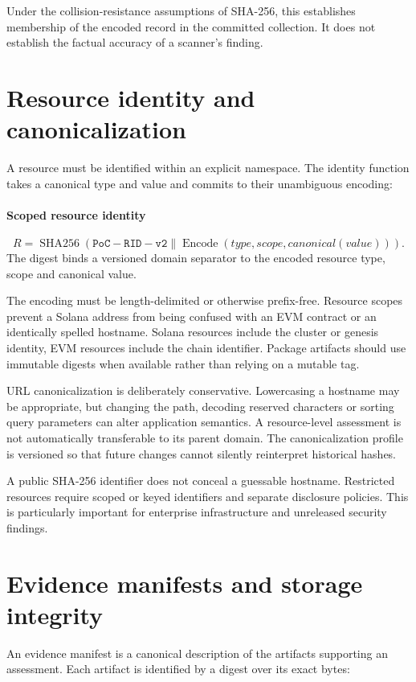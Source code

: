 \documentclass[10pt,a4paper]{article}
\begin{document}
Under the collision-resistance assumptions of SHA-256, this establishes membership of the encoded record in the committed collection. It does not establish the factual accuracy of a scanner's finding.


\section*{Resource identity and canonicalization}
A resource must be identified within an explicit namespace. The identity function takes a canonical type and value and commits to their unambiguous encoding:


\paragraph{Scoped resource identity}
\[R=\operatorname{SHA256}(\mathtt{PoC-RID-v2}\parallel\operatorname{Encode}(type,scope,canonical(value))).\]
The digest binds a versioned domain separator to the encoded resource type, scope and canonical value.


The encoding must be length-delimited or otherwise prefix-free. Resource scopes prevent a Solana address from being confused with an EVM contract or an identically spelled hostname. Solana resources include the cluster or genesis identity, EVM resources include the chain identifier. Package artifacts should use immutable digests when available rather than relying on a mutable tag.


URL canonicalization is deliberately conservative. Lowercasing a hostname may be appropriate, but changing the path, decoding reserved characters or sorting query parameters can alter application semantics. A resource-level assessment is not automatically transferable to its parent domain. The canonicalization profile is versioned so that future changes cannot silently reinterpret historical hashes.


A public SHA-256 identifier does not conceal a guessable hostname. Restricted resources require scoped or keyed identifiers and separate disclosure policies. This is particularly important for enterprise infrastructure and unreleased security findings.


\section*{Evidence manifests and storage integrity}
An evidence manifest is a canonical description of the artifacts supporting an assessment. Each artifact is identified by a digest over its exact bytes:
\end{document}
